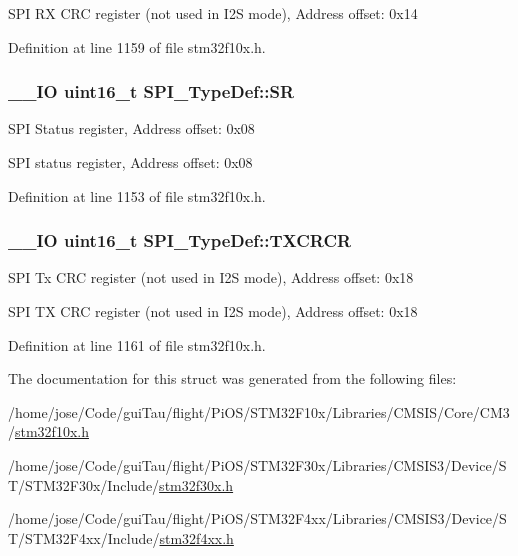 S\-P\-I R\-X C\-R\-C register (not used in I2\-S mode), Address offset\-: 0x14 

Definition at line 1159 of file stm32f10x.\-h.

\hypertarget{struct_s_p_i___type_def_a017d7d54a7bf1925facea6b5e02fec83}{
\subsubsection[{S\-R}]{\setlength{\rightskip}{0pt plus 5cm}\-\_\-\-\_\-\-I\-O {\bf uint16\-\_\-t} S\-P\-I\-\_\-\-Type\-Def\-::\-S\-R}}\label{struct_s_p_i___type_def_a017d7d54a7bf1925facea6b5e02fec83}
S\-P\-I Status register, Address offset\-: 0x08

S\-P\-I status register, Address offset\-: 0x08 

Definition at line 1153 of file stm32f10x.\-h.

\hypertarget{struct_s_p_i___type_def_a3c0c1be66bc0a1846274a7511f4a36f5}{
\subsubsection[{T\-X\-C\-R\-C\-R}]{\setlength{\rightskip}{0pt plus 5cm}\-\_\-\-\_\-\-I\-O {\bf uint16\-\_\-t} S\-P\-I\-\_\-\-Type\-Def\-::\-T\-X\-C\-R\-C\-R}}\label{struct_s_p_i___type_def_a3c0c1be66bc0a1846274a7511f4a36f5}
S\-P\-I Tx C\-R\-C register (not used in I2\-S mode), Address offset\-: 0x18

S\-P\-I T\-X C\-R\-C register (not used in I2\-S mode), Address offset\-: 0x18 

Definition at line 1161 of file stm32f10x.\-h.



The documentation for this struct was generated from the following files\-:\begin{DoxyCompactItemize}
\item 
/home/jose/\-Code/gui\-Tau/flight/\-Pi\-O\-S/\-S\-T\-M32\-F10x/\-Libraries/\-C\-M\-S\-I\-S/\-Core/\-C\-M3/\hyperlink{stm32f10x_8h}{stm32f10x.\-h}\item 
/home/jose/\-Code/gui\-Tau/flight/\-Pi\-O\-S/\-S\-T\-M32\-F30x/\-Libraries/\-C\-M\-S\-I\-S3/\-Device/\-S\-T/\-S\-T\-M32\-F30x/\-Include/\hyperlink{stm32f30x_8h}{stm32f30x.\-h}\item 
/home/jose/\-Code/gui\-Tau/flight/\-Pi\-O\-S/\-S\-T\-M32\-F4xx/\-Libraries/\-C\-M\-S\-I\-S3/\-Device/\-S\-T/\-S\-T\-M32\-F4xx/\-Include/\hyperlink{stm32f4xx_8h}{stm32f4xx.\-h}\end{DoxyCompactItemize}
